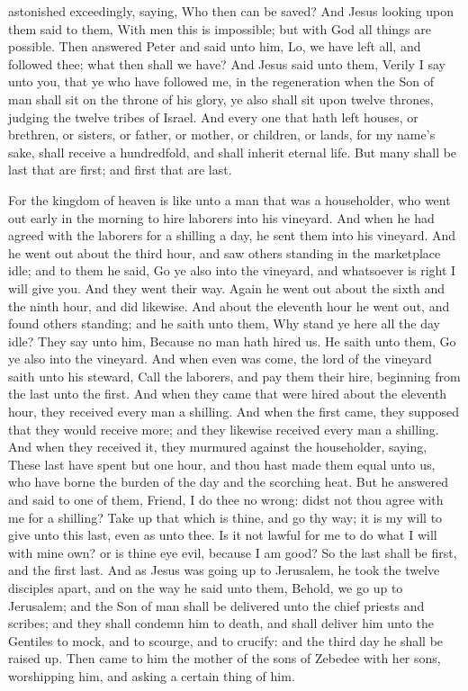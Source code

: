 astonished exceedingly, saying, Who then can be saved? And Jesus looking upon them said to them, With men this is impossible; but with God all things are possible. Then answered Peter and said unto him, Lo, we have left all, and followed thee; what then shall we have? And Jesus said unto them, Verily I say unto you, that ye who have followed me, in the regeneration when the Son of man shall sit on the throne of his glory, ye also shall sit upon twelve thrones, judging the twelve tribes of Israel. And every one that hath left houses, or brethren, or sisters, or father, or mother, or children, or lands, for my name’s sake, shall receive a hundredfold, and shall inherit eternal life. But many shall be last that are first; and first that are last. 

For the kingdom of heaven is like unto a man that was a householder, who went out early in the morning to hire laborers into his vineyard. And when he had agreed with the laborers for a shilling a day, he sent them into his vineyard. And he went out about the third hour, and saw others standing in the marketplace idle; and to them he said, Go ye also into the vineyard, and whatsoever is right I will give you. And they went their way. Again he went out about the sixth and the ninth hour, and did likewise. And about the eleventh hour he went out, and found others standing; and he saith unto them, Why stand ye here all the day idle? They say unto him, Because no man hath hired us. He saith unto them, Go ye also into the vineyard. And when even was come, the lord of the vineyard saith unto his steward, Call the laborers, and pay them their hire, beginning from the last unto the first. And when they came that were hired about the eleventh hour, they received every man a shilling. And when the first came, they supposed that they would receive more; and they likewise received every man a shilling. And when they received it, they murmured against the householder, saying, These last have spent but one hour, and thou hast made them equal unto us, who have borne the burden of the day and the scorching heat. But he answered and said to one of them, Friend, I do thee no wrong: didst not thou agree with me for a shilling? Take up that which is thine, and go thy way; it is my will to give unto this last, even as unto thee. Is it not lawful for me to do what I will with mine own? or is thine eye evil, because I am good? So the last shall be first, and the first last.  And as Jesus was going up to Jerusalem, he took the twelve disciples apart, and on the way he said unto them, Behold, we go up to Jerusalem; and the Son of man shall be delivered unto the chief priests and scribes; and they shall condemn him to death, and shall deliver him unto the Gentiles to mock, and to scourge, and to crucify: and the third day he shall be raised up.  Then came to him the mother of the sons of Zebedee with her sons, worshipping him, and asking a certain thing of him. 